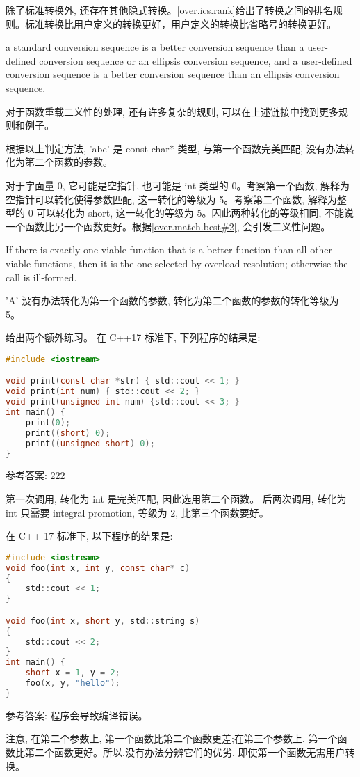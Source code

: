 \documentclass{article}
\begin{document}
	除了标准转换外, 还存在其他隐式转换。\href{https://timsong-cpp.github.io/cppwp/n4659/over.ics.rank}{[over.ics.rank]}给出了转换之间的排名规则。标准转换比用户定义的转换更好，用户定义的转换比省略号的转换更好。
	
	\begin{lightgrayleftbar}
		a standard conversion sequence is a better conversion sequence than a user-defined conversion sequence or an ellipsis conversion sequence, and
		a user-defined conversion sequence is a better conversion sequence than an ellipsis conversion sequence. 
	\end{lightgrayleftbar}
	
	对于函数重载二义性的处理, 还有许多复杂的规则, 可以在上述链接中找到更多规则和例子。
	
	根据以上判定方法,  'abc' 是 const char* 类型, 与第一个函数完美匹配, 没有办法转化为第二个函数的参数。
	
	对于字面量 0, 它可能是空指针, 也可能是 int 类型的 0。考察第一个函数, 解释为空指针可以转化使得参数匹配, 这一转化的等级为 5。考察第二个函数, 解释为整型的 0 可以转化为 short, 这一转化的等级为 5。因此两种转化的等级相同, 不能说一个函数比另一个函数更好。根据\href{https://timsong-cpp.github.io/cppwp/n4659/over.match.best#2}{[over.match.best\#2]}, 会引发二义性问题。
	
	\begin{lightgrayleftbar}
		If there is exactly one viable function that is a better function than all other viable functions, then it is the one selected by overload resolution; otherwise the call is ill-formed.
	\end{lightgrayleftbar}

	'A' 没有办法转化为第一个函数的参数, 转化为第二个函数的参数的转化等级为 5。
	
	给出两个额外练习。
	在 C++17 标准下, 下列程序的结果是:
	
	\begin{lstlisting}[language=C]
#include <iostream>

void print(const char *str) { std::cout << 1; }
void print(int num) { std::cout << 2; }
void print(unsigned int num) {std::cout << 3; }
int main() {
	print(0);
	print((short) 0);
	print((unsigned short) 0);
}
	\end{lstlisting}
	
	参考答案: 222
	
	第一次调用, 转化为 int 是完美匹配, 因此选用第二个函数。
	后两次调用, 转化为 int 只需要 integral promotion, 等级为 2, 比第三个函数要好。 
	
	在 C++ 17 标准下, 以下程序的结果是:
	\begin{lstlisting}[language=C]
#include <iostream>
void foo(int x, int y, const char* c)
{
	std::cout << 1;
}

void foo(int x, short y, std::string s)
{
	std::cout << 2;
}
int main() {
	short x = 1, y = 2;
	foo(x, y, "hello");
}
	\end{lstlisting}

	参考答案: 程序会导致编译错误。
	
	注意, 在第二个参数上, 第一个函数比第二个函数更差;在第三个参数上, 第一个函数比第二个函数更好。所以,没有办法分辨它们的优劣, 即使第一个函数无需用户转换。
\end{document}
